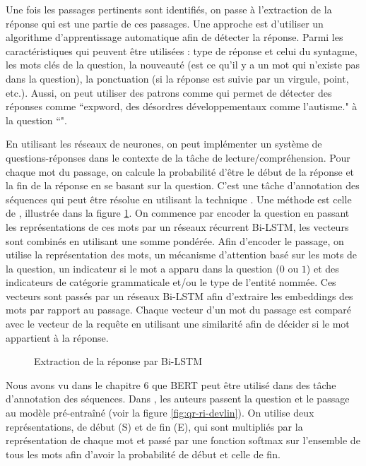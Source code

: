 \documentclass{KodeBook}
\begin{document}
Une fois les passages pertinents sont identifiés, on passe à l'extraction de la réponse qui est une partie de ces passages. 
Une approche est d'utiliser un algorithme d'apprentissage automatique afin de détecter la réponse. 
Parmi les caractéristiques qui peuvent être utilisées : type de réponse et celui du syntagme, les mots clés de la question, la nouveauté (est ce qu'il y a un mot qui n'existe pas dans la question), la ponctuation (si la réponse est suivie par un virgule, point, etc.). 
Aussi, on peut utiliser des patrons comme  qui permet de détecter des réponses comme ``expword{, des désordres développementaux comme l'autisme.}" à la question ``".


En utilisant les réseaux de neurones, on peut implémenter un système de questions-réponses dans le contexte de la tâche de lecture/compréhension. 
Pour chaque mot du passage, on calcule la probabilité d'être le début de la réponse et la fin de la réponse en se basant sur la question. 
C'est une tâche d'annotation des séquences qui peut être résolue en utilisant la technique .
Une méthode est celle de \citet{2017-chen-al}, illustrée dans la figure \ref{fig:qr-ri-chen}. 
On commence par encoder la question en passant les représentations  de ces mots par un réseaux récurrent Bi-LSTM, les vecteurs sont combinés en utilisant une somme pondérée. 
Afin d'encoder le passage, on utilise la représentation  des mots, un mécanisme d'attention basé sur les mots de la question, un indicateur si le mot a apparu dans la question ($0$ ou $1$) et des indicateurs de catégorie grammaticale et/ou le type de l'entité nommée.
Ces vecteurs sont passés par un réseaux Bi-LSTM afin d'extraire les embeddings des mots par rapport au passage. 
Chaque vecteur d'un mot du passage est comparé avec le vecteur de la requête en utilisant une similarité afin de décider si le mot appartient à la réponse.

\begin{figure}[!ht]
	\centering
	\caption{Extraction de la réponse par Bi-LSTM \cite{2019-jurafsky-martin}}
	\label{fig:qr-ri-chen}
\end{figure}

Nous avons vu dans le chapitre 6 que BERT peut être utilisé dans des tâche d'annotation des séquences.
Dans \cite{2018-devlin-al}, les auteurs passent la question et le passage au modèle pré-entraîné  (voir la figure \ref{fig:qr-ri-devlin}).
On utilise deux représentations, de début (S) et de fin (E), qui sont multipliés par la représentation de chaque mot et passé par une fonction softmax sur l'ensemble de tous les mots afin d'avoir la probabilité de début et celle de fin.
\end{document}
